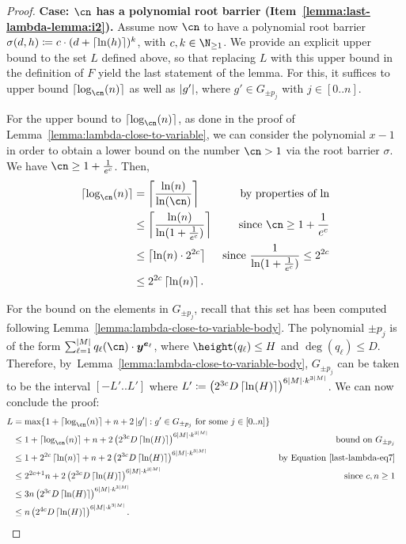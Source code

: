 \begin{proof}
    \noindent
    \textbf{Case: $\cn$ has a polynomial root barrier (Item~\eqref{lemma:last-lambda-lemma:i2}).}
    Assume now $\cn$ to have a polynomial root barrier 
    $\sigma(d,h) \coloneqq c \cdot (d+\left\lceil\ln(h)\right\rceil)^k$, 
    with $c,k \in \N_{\geq 1}$. 
    We provide an explicit upper bound to the set $L$ defined above, 
    so that replacing $L$ with this upper bound in the definition of $F$ 
    yield the last statement of the lemma.
    For this, it suffices to upper bound $\ceil{\log_{\cn}(n)}$ 
    as well as $\left|g'\right|$, where $g' \in G_{\pm p_j}$ with $j \in [0..n]$.
  
    For the upper bound to $\ceil{\log_{\cn}(n)}$, 
    as done in the proof of Lemma~\ref{lemma:lambda-close-to-variable}, 
    we can consider the polynomial $x-1$ in order to obtain a lower bound on the number $\cn > 1$ 
    via the root barrier $\sigma$. We have $\cn \geq 1 + \frac{1}{e^c}$.
    Then, 
    \begin{align}
      \ceil{\log_{\cn}(n)} & = \ceil{\frac{\ln(n)}{\ln(\cn)}} &\text{by properties of $\ln$} \notag\\
      & \leq \ceil{\frac{\ln(n)}{\ln(1 + \frac{1}{e^c})}} 
      & \text{since $\cn \geq 1 + \frac{1}{e^c}$} \notag\\
      & \leq \ceil{\ln(n) \cdot 2^{2c}} 
      & \text{since $\frac{1}{\ln(1 + \frac{1}{e^c})} \leq 2^{2c}$} \notag\\ 
      & \leq 2^{2c} \ceil{\ln(n)}. \label{last-lambda-eq7}
    \end{align}
    
    For the bound on the elements in $G_{\pm p_j}$, 
    recall that this set has been computed following 
    Lemma~\ref{lemma:lambda-close-to-variable-body}.
    The polynomial $\pm p_j$ 
    is of the form $\sum_{\ell=1}^{\abs{M}} q_{\ell}(\cn) \cdot \vec{y}^{\vec{e}_\ell}$, where 
    $\height(q_\ell) \leq H$ and $\deg(q_{\ell}) \leq D$.
    Therefore,
    by~Lemma~\ref{lemma:lambda-close-to-variable-body}, 
    $G_{\pm p_j}$ can be taken to be the interval $[-L'..L']$ where $L' \coloneqq \left(2^{3c}D\left\lceil\ln(H)\right\rceil\right)^{6\left|M\right| \cdot k^{3\left|M\right|}}$.
    We can now conclude the proof:
    \begin{align*} 
      L &= \max \{ 1 + \ceil{\log_{\cn}(n)} + n + 2 \abs{g'} : g' \in G_{\pm p_j} \text{ for some } j \in [0..n]\}\\ 
      & \leq 1 + \ceil{\log_{\cn}(n)} + n + 2\left(2^{3c}D\ceil{\ln(H)}\right)^{6\abs{M} \cdot k^{3\abs{M}}}
      &\text{bound on $G_{\pm p_j}$}\\
      & \leq 1 + 2^{2c}\ceil{\ln(n)} + n + 2\left(2^{3c}D\ceil{\ln(H)}\right)^{6\abs{M} \cdot k^{3\abs{M}}}
      &\text{by Equation~\ref{last-lambda-eq7}}\\
      & \leq 2^{2c+1}n + 2\left(2^{3c}D\ceil{\ln(H)}\right)^{6\abs{M} \cdot k^{3\abs{M}}}
      &\text{since $c,n \geq 1$}\\
      & \leq 3n\left(2^{3c}D\ceil{\ln(H)}\right)^{6\abs{M} \cdot k^{3\abs{M}}}\\
      & \leq n\left(2^{4c}D\ceil{\ln(H)}\right)^{6\abs{M} \cdot k^{3\abs{M}}}.
      &&\qedhere
    \end{align*}
  

\end{proof}
